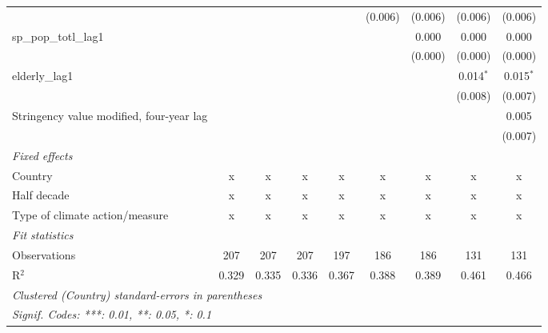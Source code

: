\begin{tabular}{lcccccccc}
                                                               &               &               &               &              & (0.006) & (0.006) & (0.006)      & (0.006)\\   
   sp\_pop\_totl\_lag1                                         &               &               &               &              &         & 0.000   & 0.000        & 0.000\\   
                                                               &               &               &               &              &         & (0.000) & (0.000)      & (0.000)\\   
   elderly\_lag1                                               &               &               &               &              &         &         & 0.014$^{*}$  & 0.015$^{*}$\\   
                                                               &               &               &               &              &         &         & (0.008)      & (0.007)\\   
   Stringency value modified, four-year lag                    &               &               &               &              &         &         &              & 0.005\\   
                                                               &               &               &               &              &         &         &              & (0.007)\\   
   \emph{Fixed effects}\\
   Country                                                     & x             & x             & x             & x            & x       & x       & x            & x\\  
   Half decade                                                 & x             & x             & x             & x            & x       & x       & x            & x\\  
   Type of climate action/measure                              & x             & x             & x             & x            & x       & x       & x            & x\\  
   \midrule \emph{Fit statistics}\\
   Observations                                                & 207           & 207           & 207           & 197          & 186     & 186     & 131          & 131\\  
   R$^2$                                                       & 0.329         & 0.335         & 0.336         & 0.367        & 0.388   & 0.389   & 0.461        & 0.466\\  
   \midrule
   \multicolumn{9}{l}{\emph{Clustered (Country) standard-errors in parentheses}}\\
   \multicolumn{9}{l}{\emph{Signif. Codes: ***: 0.01, **: 0.05, *: 0.1}}\\
\end{tabular}
\par\endgroup



